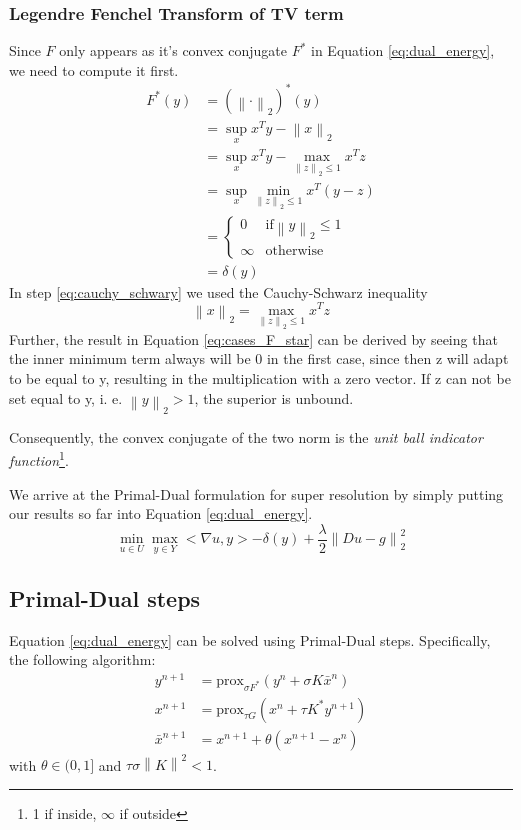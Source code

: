 \documentclass{paper}
\newcommand{\prox}{\text{prox}}
\newcommand{\norm}[1]{\left\lVert#1\right\rVert}
\newcommand{\twonorm}[1]{\left\lVert#1\right\rVert_2}
\begin{document}
\subsubsection*{Legendre Fenchel Transform of TV term}
Since $F$ only appears as it's convex conjugate $F^*$ in Equation \eqref{eq:dual_energy}, we need to compute it first.
\begin{align}
	F^*(y) &= (\norm{\cdot}_2)^*(y) \\
		  &= \sup_x x^T y - \twonorm{x} \\
		  &= \sup_x x^T y - \max_{\twonorm{z} \leq 1} x^T z \label{eq:cauchy_schwary}\\
		  &= \sup_x \min_{\twonorm{z} \leq 1} x^T(y-z) \\
		  &= \begin{cases}
   				0  			& \text{if} \twonorm{y} \leq 1 \\
   				\infty      & \text{otherwise}
  			 \end{cases} \label{eq:cases_F_star} \\
  	      &= \delta(y)
\end{align}
In step \eqref{eq:cauchy_schwary} we used the Cauchy-Schwarz inequality
\begin{equation}
	\twonorm{x} = \max_{\twonorm{z} \leq 1} x^T z
\end{equation}
Further, the result in Equation \eqref{eq:cases_F_star} can be derived by seeing that 
the inner minimum term always will be 0 in the first case, since then z will adapt to be
equal to y, resulting in the multiplication with a zero vector. If z can not be set equal
to y, i. e. $\twonorm{y} > 1$, the superior is unbound.

Consequently, the convex conjugate of the two norm is the \emph{unit ball indicator function}\footnote{1 if inside, $\infty$ if outside}.

We arrive at the Primal-Dual formulation for super resolution by simply putting our
results so far into Equation \eqref{eq:dual_energy}.
\begin{equation}
\min_{u \in U} \max_{y \in Y} <\nabla u, y> - \delta(y) + \frac{\lambda}{2}\twonorm{Du - g}^2
\end{equation}

\subsection*{Primal-Dual steps}
Equation \eqref{eq:dual_energy} can be solved using Primal-Dual steps. Specifically,
the following algorithm:
\begin{align}
	y^{n+1} &= \prox_{\sigma F^*}(y^n + \sigma K \bar{x}^n) \label{eq:yn1} \\
	x^{n+1} &= \prox_{\tau G}(x^n + \tau K^* y^{n+1}) \label{eq:xn1} \\
	\bar{x}^{n+1} &= x^{n+1} + \theta(x^{n+1} - x^n) \label{ex:barxn1}
\end{align}
with $\theta \in (0, 1]$ and $\tau \sigma \norm{K}^2 < 1$. 
\end{document}
